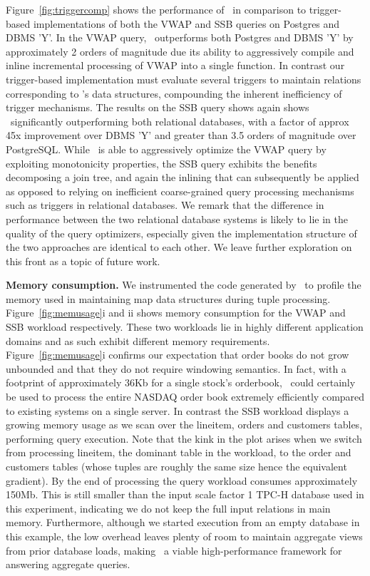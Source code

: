 Figure~\ref{fig:triggercomp} shows the performance of \compiler\ in comparison to
trigger-based implementations of both the VWAP and SSB queries on Postgres and
DBMS 'Y'. In the VWAP query, \compiler\ outperforms both Postgres and DBMS 'Y' by
approximately 2 orders of magnitude due its ability to aggressively compile and
inline incremental processing of VWAP into a single function. In contrast our
trigger-based implementation must evaluate several triggers to maintain relations
corresponding to \compiler's data structures, compounding the inherent
inefficiency of trigger mechanisms. The results on the SSB query shows again
shows \compiler\ significantly outperforming both relational databases, with a
factor of approx 45x improvement over DBMS 'Y' and greater than 3.5 orders of
magnitude over PostgreSQL. While \compiler\ is able to aggressively optimize the
VWAP query by exploiting monotonicity properties, the SSB query exhibits the
benefits decomposing a join tree, and again the inlining that can subsequently be
applied as opposed to relying on inefficient coarse-grained query processing
mechanisms such as triggers in relational databases. We remark that the
difference in performance between the two relational database systems is likely
to lie in the quality of the query optimizers, especially given the
implementation structure of the two approaches are identical to each other. We
leave further exploration on this front as a topic of future work.


\textbf{Memory consumption.}
We instrumented the code generated by \compiler\ to profile the memory used in
maintaining map data structures during tuple processing.
Figure~\ref{fig:memusage}i and ii shows memory consumption for the VWAP
and SSB workload respectively. These two workloads lie in highly different
application domains and as such exhibit different memory requirements.
Figure~\ref{fig:memusage}i confirms our expectation that order books do not
grow unbounded and that they do not require windowing semantics. In fact, with
a footprint of approximately 36Kb for a single stock's orderbook, \compiler\
could certainly be used to process the entire NASDAQ order book extremely
efficiently compared to existing systems on a single server.
In contrast the SSB workload displays a growing memory usage as we scan over the
lineitem, orders and customers tables, performing query execution. Note that the
kink in the plot arises when we switch from processing lineitem, the dominant
table in the workload, to the order and customers tables (whose tuples are
roughly the same size hence the equivalent gradient). By the end of processing
the query workload consumes approximately 150Mb. This is still smaller than the
input scale factor 1 TPC-H database used in this experiment, indicating we do
not keep the full input relations in main memory. Furthermore, although we
started execution from an empty database in this example, the low overhead
leaves plenty of room to maintain aggregate views from prior database loads,
making \compiler\ a viable high-performance framework for answering aggregate
queries.

